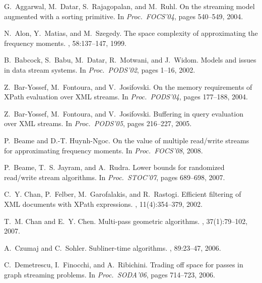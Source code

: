 \documentclass[proceedings]{stacs}
\theoremstyle{plain}\newtheorem{satz}[thm]{Satz}
\theoremstyle{definition}\newtheorem{crucial}[thm]{Crucial Definition}
\begin{document}
\begin{thebibliography}{10}

G.~Aggarwal, M.~Datar, S.~Rajagopalan, and M.~Ruhl.
\newblock On the streaming model augmented with a sorting primitive.
\newblock In {\em Proc.\ FOCS'04}, pages 540--549, 2004.

N.~Alon, Y.~Matias, and M.~Szegedy.
\newblock The space complexity of approximating the frequency moments.
, 58:137--147, 1999.

B.~Babcock, S.~Babu, M.~Datar, R.~Motwani, and J.~Widom.
\newblock Models and issues in data stream systems.
\newblock In {\em Proc.\ PODS'02}, pages 1--16, 2002.

Z.~Bar-Yossef, M.~Fontoura, and V.~Josifovski.
\newblock On the memory requirements of {XPath} evaluation over {XML} streams.
\newblock In {\em Proc.\ PODS'04}, pages 177--188, 2004.

Z.~Bar-Yossef, M.~Fontoura, and V.~Josifovski.
\newblock Buffering in query evaluation over {XML} streams.
\newblock In {\em Proc.\ PODS'05}, pages 216--227, 2005.

P.~Beame and D.-T. Huynh-Ngoc.
\newblock On the value of multiple read/write streams for approximating
  frequency moments.
\newblock In {\em Proc.\ FOCS'08}, 2008.

P.~Beame, T.~S. Jayram, and A.~Rudra.
\newblock Lower bounds for randomized read/write stream algorithms.
\newblock In {\em Proc.\ STOC'07}, pages 689--698, 2007.

C.~Y. Chan, P.~Felber, M.~Garofalakis, and R.~Rastogi.
\newblock Efficient filtering of {XML} documents with {XPath} expressions.
, 11(4):354--379, 2002.

T.~M. Chan and E.~Y. Chen.
\newblock Multi-pass geometric algorithms.
, 37(1):79--102, 2007.

A.~Czumaj and C.~Sohler.
\newblock Subliner-time algorithms.
, 89:23--47, 2006.

C.~Demetrescu, I.~Finocchi, and A.~Ribichini.
\newblock Trading off space for passes in graph streaming problems.
\newblock In {\em Proc.\ SODA'06}, pages 714--723, 2006.


\end{thebibliography}
\end{document}

